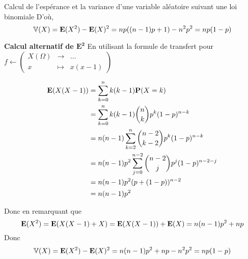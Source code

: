 \documentclass{article}
\renewenvironment{question_kholle}[2][ ]
{
	\subsection{\texorpdfstring{#2}{}}
	\notblank{#1}
	{
		\noindent #1
		\bigbreak
	}
	{}
	\begin{proof}
}
{
	\end{proof}
}
\begin{document}
\begin{question_kholle}{Calcul de l'espérance et la variance d'une variable aléatoire suivant une loi binomiale}
	D'où,
	$$
	\mathbb V(X) = \mathbf E(X^{2}) - \mathbf E(X)^{2}=np((n-1)p+1)- n^{2} p ^{2}=np(1-p)
	$$
	
	\textbf{Calcul alternatif de $\mathbf{E^2}$} En utilisant la formule de transfert pour $f \leftarrow \left( \begin{matrix}
		X(\Omega) &\to &\dots \\
		x &\mapsto &x(x-1)
	\end{matrix} \right)$
	
	
	\begin{align*}
		\mathbf E(X(X - 1)) &= \sum_{k=0}^{n}k(k-1)\mathbf P(X=k) \\
		&= \sum_{k=0}^{n}k(k-1)\binom{n}{k}p^{k}(1-p)^{n-k} \\
		&= n(n-1) \sum_{k=2}^{n}\binom{n-2}{k-2}p^{k}(1-p)^{n-k} \\
		&= n(n-1)p^{2} \sum_{j=0}^{n-2} \binom{n-2}{j}p^{j}(1-p)^{n-2-j} \\
		&= n(n-1) p^{2} (p + (1-p))^{n-2} \\
		&= n(n-1)p^{2}
	\end{align*}
	
	Donc en remarquant que $$\mathbf E(X^{2}) = \mathbf E(X(X-1)+X) = \mathbf E(X(X-1))+\mathbf E(X)= n(n-1)p^{2} + np$$
	Donc
	$$\mathbb V(X) = \mathbf E(X^{2})- \mathbf E(X)^{2} = n(n-1)p^{2} + np - n^{2}p^{2} = np(1-p)$$
	
	
\end{question_kholle}
\end{document}
